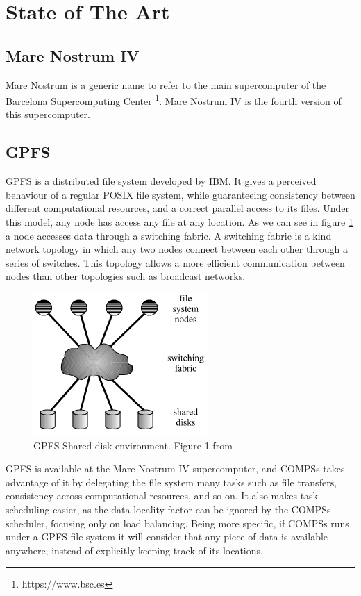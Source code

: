 \section{State of The Art}
\label{sec:state_of_the_art}

\subsection{Mare Nostrum IV}
\label{subsec:mare_nostrum}
Mare Nostrum is a generic name to refer to the main supercomputer of the Barcelona Supercomputing Center \footnote{https://www.bsc.es}. Mare Nostrum IV is the fourth version of this supercomputer. 

\subsection{GPFS}
\label{subsec:gpfs}
GPFS \cite{schmuck2002gpfs} is a distributed file system developed by IBM. It gives a perceived behaviour of a regular POSIX file system, while guaranteeing consistency between different computational resources, and a correct parallel access to its files. Under this model, any node has access any file at any location. As we can see in figure \ref{fig:gpfs_schema} a node accesses data through a switching fabric. A switching fabric is a kind network topology in which any two nodes connect between each other through a series of switches. This topology allows a more efficient communication between nodes than other topologies such as broadcast networks.
\begin{figure}[ht!]
\centering
\includegraphics{figures/gpfs_schema.png}
\caption{GPFS Shared disk environment. Figure 1 from \cite{schmuck2002gpfs}}
\label{fig:gpfs_schema}
\end{figure}
GPFS is available at the Mare Nostrum IV supercomputer, and COMPSs takes advantage of it by delegating the file system many tasks such as file transfers, consistency across computational resources, and so on. It also makes task scheduling easier, as the data locality factor can be ignored by the COMPSs scheduler, focusing only on load balancing. Being more specific, if COMPSs runs under a GPFS file system it will consider that any piece of data is available anywhere, instead of explicitly keeping track of its locations.

